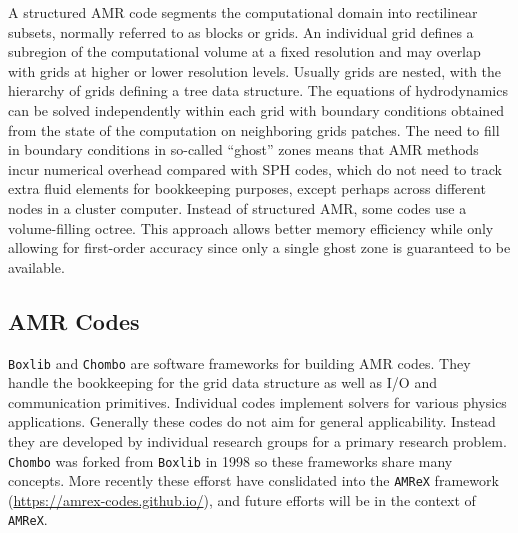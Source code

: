 \documentclass[11pt,twoside]{article}
\begin{document}
A structured AMR code segments the computational domain into rectilinear subsets, normally referred to as blocks or grids. An individual grid defines a subregion of the computational volume at a fixed resolution and may overlap with grids at higher or lower resolution levels. Usually grids are nested, with the hierarchy of grids defining a tree data structure. The equations of hydrodynamics can be solved independently within each grid with boundary conditions obtained from the state of the computation on neighboring grids patches. The need to fill in boundary conditions in so-called ``ghost'' zones means that AMR methods incur numerical overhead compared with SPH codes, which do not need to track extra fluid elements for bookkeeping purposes, except perhaps across different nodes in a cluster computer. Instead of structured AMR, some codes use a volume-filling octree. This approach allows better memory efficiency while only allowing for first-order accuracy since only a single ghost zone is guaranteed to be available.

\subsection{AMR Codes}

\texttt{Boxlib} \citep{zhang2016} and \texttt{Chombo} \citep{adams2015} are software frameworks for building AMR codes. They handle the bookkeeping for the grid data structure as well as I/O and communication primitives. Individual codes implement solvers for various physics applications. Generally these codes do not aim for general applicability. Instead they are developed by individual research groups for a primary research problem. \texttt{Chombo} was forked from \texttt{Boxlib} in 1998 so these frameworks share many concepts. More recently these efforst have conslidated into the \texttt{AMReX} framework (\url{https://amrex-codes.github.io/}), and future efforts will be in the context of \texttt{AMReX}.
\end{document}
